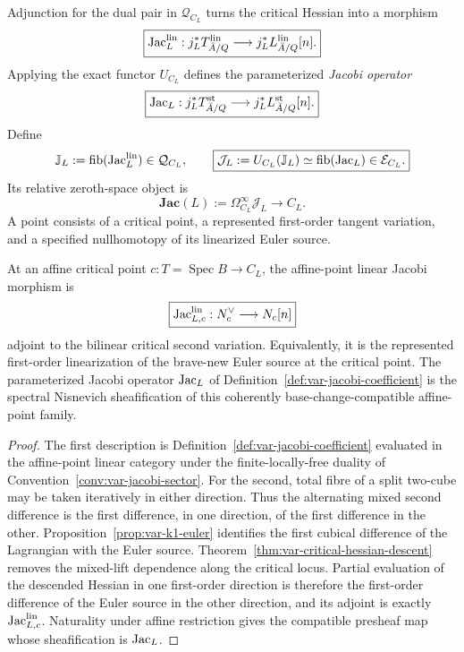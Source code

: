 \begin{definition}
\label{def:var-jacobi-coefficient}
Adjunction for the dual pair in \(\mathcal Q_{C_L}\) turns the critical Hessian into a morphism
\[
    \boxed{
    \operatorname{Jac}_L^{\mathrm{lin}}:
    j_L^*T^{\mathrm{lin}}_{\bar A/Q}
    \longrightarrow
    j_L^*L^{\mathrm{lin}}_{\bar A/Q}[n].
    }
\]
Applying the exact functor \(U_{C_L}\) defines the parameterized \emph{Jacobi operator}
\[
    \boxed{
    \operatorname{Jac}_L:
    j_L^*T^{\mathrm{st}}_{\bar A/Q}
    \longrightarrow
    j_L^*L^{\mathrm{st}}_{\bar A/Q}[n].
    }
\]
Define
\[
    \mathbb J_L:=\operatorname{fib}(\operatorname{Jac}_L^{\mathrm{lin}})\in\mathcal Q_{C_L},
    \qquad
    \boxed{
    \mathcal J_L
    :=
    U_{C_L}(\mathbb J_L)
    \simeq
    \operatorname{fib}(\operatorname{Jac}_L)
    \in
    \mathcal E_{C_L}.
    }
\]
Its relative zeroth-space object is
\[
    \boxed{
    \mathbf{Jac}(L)
    :=
    \Omega_{C_L}^\infty\mathcal J_L
    \longrightarrow
    C_L.
    }
\]
A point consists of a critical point, a represented first-order tangent variation, and a specified nullhomotopy of its linearized Euler source.
\end{definition}

\begin{proposition}
\label{prop:var-jacobi-affine}
At an affine critical point \(c:T=\operatorname{Spec}B\to C_L\), the affine-point linear Jacobi morphism is
\[
    \boxed{
    \operatorname{Jac}^{\mathrm{lin}}_{L,c}:
    N_c^\vee
    \longrightarrow
    N_c[n]
    }
\]
adjoint to the bilinear critical second variation.  Equivalently, it is the represented first-order linearization of the brave-new Euler source at the critical point.  The parameterized Jacobi operator \(\operatorname{Jac}_L\) of Definition~\ref{def:var-jacobi-coefficient} is the spectral Nisnevich sheafification of this coherently base-change-compatible affine-point family.
\end{proposition}

\begin{proof}
The first description is Definition~\ref{def:var-jacobi-coefficient} evaluated in the affine-point linear category under the finite-locally-free duality of Convention~\ref{conv:var-jacobi-sector}.  For the second, total fibre of a split two-cube may be taken iteratively in either direction.  Thus the alternating mixed second difference is the first difference, in one direction, of the first difference in the other.  Proposition~\ref{prop:var-k1-euler} identifies the first cubical difference of the Lagrangian with the Euler source.  Theorem~\ref{thm:var-critical-hessian-descent} removes the mixed-lift dependence along the critical locus.  Partial evaluation of the descended Hessian in one first-order direction is therefore the first-order difference of the Euler source in the other direction, and its adjoint is exactly \(\operatorname{Jac}^{\mathrm{lin}}_{L,c}\).  Naturality under affine restriction gives the compatible presheaf map whose sheafification is \(\operatorname{Jac}_L\).
\end{proof}

